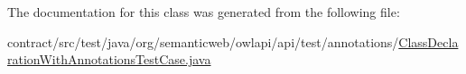 The documentation for this class was generated from the following file\-:\begin{DoxyCompactItemize}
\item 
contract/src/test/java/org/semanticweb/owlapi/api/test/annotations/\hyperlink{_class_declaration_with_annotations_test_case_8java}{Class\-Declaration\-With\-Annotations\-Test\-Case.\-java}\end{DoxyCompactItemize}
